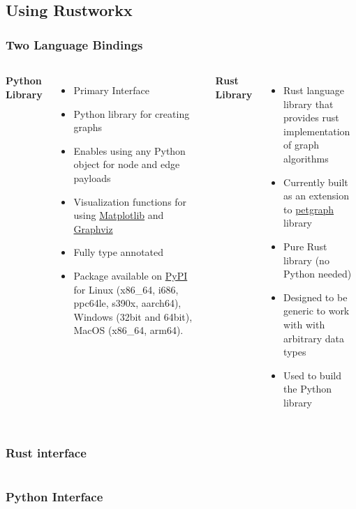 \documentclass[aspectratio=169,11pt,hyperref={colorlinks=true}]{beamer}
\begin{document}
\subsection{Using Rustworkx}
\begin{frame}
    \frametitle{Two Language Bindings}
    \begin{columns}
        \textbf{Python Library}
        \begin{itemize}
            \item Primary Interface
            \item Python library for creating graphs
            \item Enables using any Python object for node and edge payloads
            \item Visualization functions for using \href{https://matplotlib.org/}{Matplotlib} and \href{https://graphviz.org/}{Graphviz}
            \item Fully type annotated
            \item Package available on \href{https://pypi.org/project/rustworkx/}{PyPI} for Linux (x86\_64, i686, ppc64le, s390x, aarch64), Windows (32bit and 64bit), MacOS (x86\_64, arm64).
        \end{itemize}
        \textbf{Rust Library}
        \begin{itemize}
            \item Rust language library that provides rust implementation of graph algorithms
            \item Currently built as an extension to \href{https://docs.rs/petgraph/latest/petgraph/}{petgraph} library
            \item Pure Rust library (no Python needed)
            \item Designed to be generic to work with with arbitrary data types
            \item Used to build the Python library
        \end{itemize}
    \end{columns}
\end{frame}

\begin{frame}
    \frametitle{Rust interface}
    \inputminted{Rust}{rust_example.rs}
\end{frame}

\begin{frame}
    \frametitle{Python Interface}
    \inputminted{Python}{python_example.py}
\end{frame}
\end{document}
